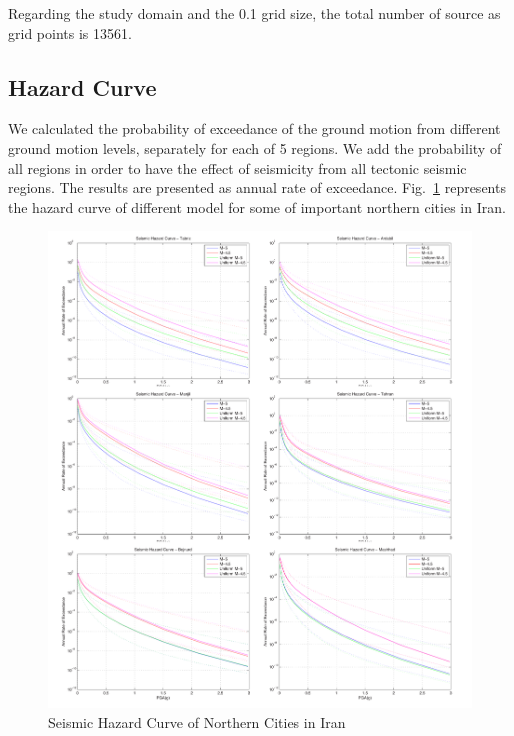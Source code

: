 Regarding the study domain and the 0.1 grid size, the total number of source as grid points is 13561. 


\subsection{Hazard Curve}

We calculated the probability of exceedance of the ground motion from different ground motion levels, separately for each of 5 regions. We add the probability of all regions in order to have the effect of seismicity from all tectonic seismic regions. The results are presented as annual rate of exceedance. Fig.~\ref{fig:hazardcurve} represents the hazard curve of different model for some of important northern cities in Iran. 

\begin{figure} [!ht]
\centering
\includegraphics[scale=0.4]{figures/pdf/HazardCurve.pdf} 
\caption{Seismic Hazard Curve of Northern Cities in Iran}
\label{fig:hazardcurve}
\end{figure}


